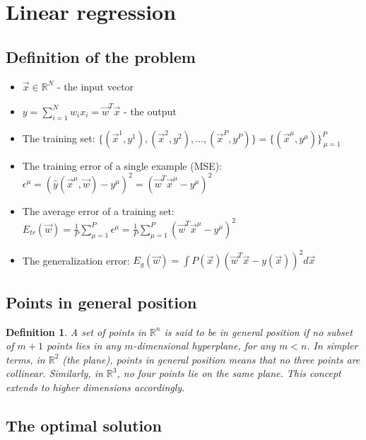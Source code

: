 \documentclass[11pt]{book} %
\newtheorem{definition}{Definition}[section]
\begin{document}
%
%
%

\section{Linear regression}
\subsection{Definition of the problem}
\begin{itemize}
    \item $\vec{x} \in \mathbb{R}^N$ - the input vector
    \item $y = \sum_{i=1}^{N} w_i x_i = \vec{w}^T \vec{x}$ - the output
    \item The training set: $\{(\vec{x}^1, y^1), (\vec{x}^2, y^2), \ldots, (\vec{x}^P, y^P)\} = \{(\vec{x}^\mu, y^\mu)\}_{\,\mu=1}^{P}$
    \item The training error of a single example (MSE): $\epsilon^\mu = (\hat{y}(\vec{x}^\mu, \vec{w}) - y^\mu)^2 = (\vec{w}^T \vec{x}^\mu - y^\mu)^2$
    \item The average error of a training set: $E_{tr}(\vec{w}) = \frac{1}{P} \sum_{\mu=1}^{P} \epsilon^\mu = \frac{1}{P} \sum_{\mu=1}^{P} (\vec{w}^T \vec{x}^\mu - y^\mu)^2$
    \item The generalization error: $E_{g}(\vec{w}) = \int P(\vec{x}) (\vec{w}^T \vec{x} - y(\vec{x}))^2 d\vec{x}$
\end{itemize}

%
%

\subsection{Points in general position}
\begin{definition}
A set of points in \(\mathbb{R}^n\) is said to be in \textit{general position} if no subset of \(m+1\) points lies in any \(m\)-dimensional hyperplane, for any \(m < n\). In simpler terms, in \(\mathbb{R}^2\) (the plane), points in general position means that no three points are collinear. Similarly, in \(\mathbb{R}^3\), no four points lie on the same plane. This concept extends to higher dimensions accordingly.
\end{definition}

%
%

\subsection{The optimal solution}
\end{document}
